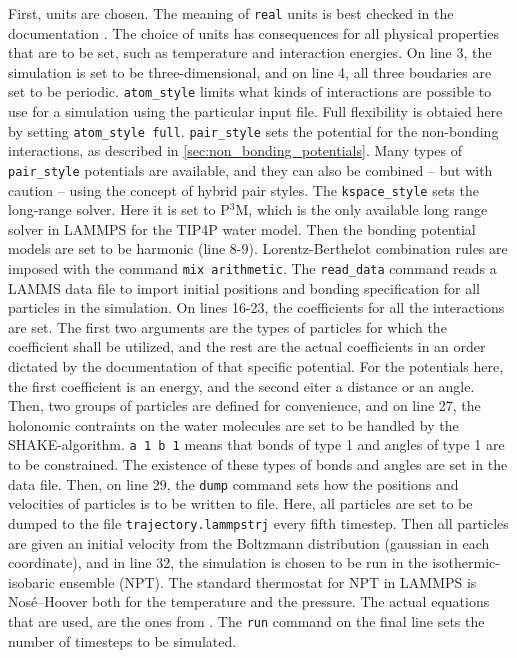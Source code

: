 First, units are chosen. The meaning of {\tt real} units is best checked in the documentation \cite{lammps:documentation}. The choice of units has consequences for all physical properties that are to be set, such as temperature and interaction energies. On line 3, the simulation is set to be three-dimensional, and on line 4, all three boudaries are set to be periodic. {\tt atom\_style} limits what kinds of interactions are possible to use for a simulation using the particular input file. Full flexibility is obtaied here by setting {\tt atom\_style full}. {\tt pair\_style} sets the potential for the non-bonding interactions, as described in \ref{sec:non_bonding_potentials}. Many types of {\tt pair\_style} potentials are available, and they can also be combined -- but with caution -- using the concept of hybrid pair styles. The {\tt kspace\_style} sets the long-range solver. Here it is set to P$^3$M, which is the only available long range solver in LAMMPS for the TIP4P water model. Then the bonding potential models are set to be harmonic (line 8-9). Lorentz-Berthelot combination rules are imposed with the command {\tt mix arithmetic}. The {\tt read\_data} command reads a LAMMS data file to import initial positions and bonding specification for all particles in the simulation. On lines 16-23, the coefficients for all the interactions are set. The first two arguments are the types of particles for which the coefficient shall be utilized, and the rest are the actual coefficients in an order dictated by the documentation of that specific potential. For the potentials here, the first coefficient is an energy, and the second eiter a distance or an angle. Then, two groups of particles are defined for convenience, and on line 27, the holonomic contraints on the water molecules are set to be handled by the SHAKE-algorithm. {\tt a 1 b 1} means that bonds of type 1 and angles of type 1 are to be constrained. The existence of these types of bonds and angles are set in the data file. Then, on line 29, the {\tt dump} command sets how the positions and velocities of particles is to be written to file. Here, all particles are set to be dumped to the file {\tt trajectory.lammpstrj} every fifth timestep. Then all particles are given an initial velocity from the Boltzmann distribution (gaussian in each coordinate), and in line 32, the simulation is chosen to be run in the isothermic-isobaric ensemble (NPT). The standard thermostat for NPT in LAMMPS is Nosé--Hoover both for the temperature and the pressure. The actual equations that are used, are the ones from \citet{shinoda2004rapid}.  The {\tt run} command on the final line sets the number of timesteps to be simulated.

